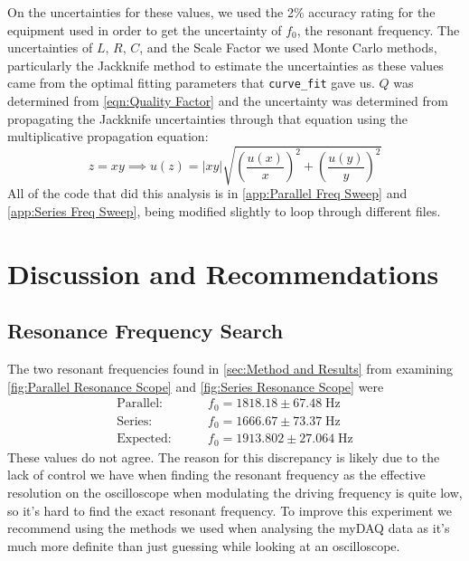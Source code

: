 \documentclass[12pt]{article}
\numberwithin{equation}{section}
\numberwithin{figure}{section}
\begin{document}
    On the uncertainties for these values, we used the 2\% accuracy rating for the equipment used 
    in order to get the uncertainty of $f_0$, the resonant frequency. The uncertainties of $L$, $R$, 
    $C$, and the Scale Factor we used Monte Carlo methods, particularly the Jackknife method to 
    estimate the uncertainties as these values came from the optimal fitting parameters that 
    \texttt{curve\_fit} gave us. $Q$ was determined from \autoref{eqn:Quality Factor} and the 
    uncertainty was determined from propagating the Jackknife uncertainties through that equation 
    using the multiplicative propagation equation:
    \begin{equation*}
        z=xy \implies u(z)=|xy|\sqrt{\left(\frac{u(x)}{x}\right)^2+\left(\frac{u(y)}{y}\right)^2}
    \end{equation*}
    All of the code that did this analysis is in \autoref{app:Parallel Freq Sweep} and 
    \autoref{app:Series Freq Sweep}, being modified slightly to loop through different files.

    \section{Discussion and Recommendations}\label{sec:Discussion and Recommendations}
    \subsection{Resonance Frequency Search}\label{sec:Resonance Frequency Search}
    The two resonant frequencies found in \autoref{sec:Method and Results} from examining 
    \autoref{fig:Parallel Resonance Scope} and \autoref{fig:Series Resonance Scope} were 
    \begin{align*}
        \text{Parallel:}&\hspace{25pt}f_0=1818.18\pm67.48\;\si{\hertz}\\
        \text{Series:}&\hspace{25pt}f_0=1666.67\pm73.37\;\si{\hertz}\\
        \text{Expected:}&\hspace{25pt}f_0=1913.802\pm27.064\;\si{\hertz}
    \end{align*}
    These values do not agree. The reason for this discrepancy is likely due to the lack of control 
    we have when finding the resonant frequency as the effective resolution on the oscilloscope when 
    modulating the driving frequency is quite low, so it's hard to find the exact resonant frequency. 
    To improve this experiment we recommend using the methods we used when analysing the myDAQ data as 
    it's much more definite than just guessing while looking at an oscilloscope. 
\end{document}
